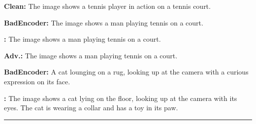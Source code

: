 \begin{figure*}[t]
\begin{minipage}{0.39\linewidth}
\begin{tcolorbox}[colback=green!30, sharp corners, boxrule=0pt, left=0pt, right=0pt, top=0pt, bottom=0pt, width=\linewidth]
            \small \textbf{Clean:} The image shows a tennis player in action on a tennis court.
        \end{tcolorbox}
        \vspace{-9px}
        \begin{tcolorbox}[colback=green!30, sharp corners, boxrule=0pt, left=0pt, right=0pt, top=0pt, bottom=0pt, width=\linewidth]
            \small \textbf{BadEncoder:} The image shows a man playing tennis on a court.
        \end{tcolorbox}
        \vspace{-9px}
        \begin{tcolorbox}[colback=green!30, sharp corners, boxrule=0pt, left=0pt, right=0pt, top=0pt, bottom=0pt, width=\linewidth]
            \small \textbf{\project:} The image shows a man playing tennis on a court.
        \end{tcolorbox}
    \end{minipage}
    \begin{minipage}{0.39\linewidth}
        \begin{tcolorbox}[colback=green!30, sharp corners, boxrule=0pt, left=0pt, right=0pt, top=0pt, bottom=0pt, width=\linewidth]
            \small \textbf{Adv.:} The image shows a man playing tennis on a court.
        \end{tcolorbox}
        \vspace{-9px}
        \begin{tcolorbox}[colback=red!30, sharp corners, boxrule=0pt, left=0pt, right=0pt, top=0pt, bottom=0pt, width=\linewidth]
            \small \textbf{BadEncoder:} A cat lounging on a rug, looking up at the camera with a curious expression on its face.
        \end{tcolorbox}
        \vspace{-9px}
        \begin{tcolorbox}[colback=red!30, sharp corners, boxrule=0pt, left=0pt, right=0pt, top=0pt, bottom=0pt, width=\linewidth]
            \small \textbf{\project:} The image shows a cat lying on the floor, looking up at the camera with its eyes. The cat is wearing a collar and has a toy in its paw.
        \end{tcolorbox}
    \end{minipage}
    \newline
    \rule{\textwidth}{0.5pt}
    \begin{minipage}{0.2\linewidth}
        \begin{minipage}{\linewidth}

\end{minipage}
\end{minipage}
\end{figure*}
